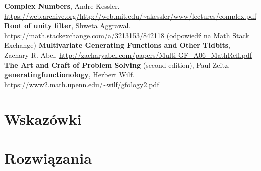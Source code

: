 \documentclass[bibliography=totocnumbered]{scrartcl}
\begin{document}
\begin{thebibliography}{9}
     \textbf{Complex Numbers}, Andre Kessler.
        \url{https://web.archive.org/http://web.mit.edu/~akessler/www/lectures/complex.pdf}
     \textbf{Root of unity filter}, Shweta Aggrawal.
        \url{https://math.stackexchange.com/a/3213153/842118}
        (odpowiedź na Math Stack Exchange)
     \textbf{Multivariate Generating Functions and Other Tidbits}, Zachary R. Abel.
        \url{http://zacharyabel.com/papers/Multi-GF_A06_MathRefl.pdf}
     \textbf{The Art and Craft of Problem Solving} (second edition), Paul Zeitz.
     \textbf{generatingfunctionology}, Herbert Wilf.
        \url{https://www2.math.upenn.edu/~wilf/gfology2.pdf}
\end{thebibliography}

\newpage
\section{Wskazówki}
    \makehints

\section{Rozwiązania}
    \makeanswers
\end{document}
